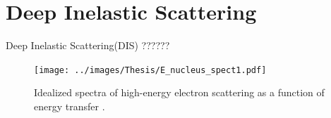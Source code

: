 \documentclass[12pt,usenames,dvipsnames]{beamer}
\begin{document}


\section[DIS]{Deep Inelastic Scattering}


\begin{frame}
\begin{block}{Deep Inelastic Scattering(DIS) ??????}
\begin{figure}[]
	\centering
	\texttt{[image: ../images/Thesis/E\_nucleus\_spect1.pdf]}
	\vspace{20pt}
	\caption*{ Idealized spectra of high-energy electron scattering as a function of energy transfer \cite{spectrum}.}
	
\end{figure}

\end{block}
\end{frame}
\end{document}
